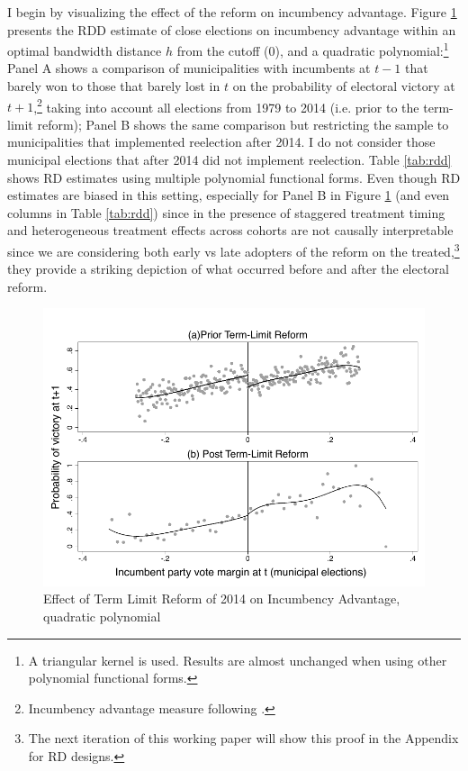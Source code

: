 \documentclass[12pt]{amsart}
\numberwithin{equation}{section}
\theoremstyle{definition}
\theoremstyle{definition}
\theoremstyle{definition}
\begin{document}
\begin{appendix}
I begin by visualizing the effect of the reform on incumbency advantage.  Figure \ref{fig:incumbency_advantage} presents the RDD estimate of close elections on incumbency advantage  within an optimal bandwidth distance $h$ from the cutoff (0), and a quadratic polynomial:\footnote{A triangular kernel is used. Results are almost unchanged when using other polynomial functional forms.} Panel A shows a comparison of municipalities with incumbents at $t-1$ that barely won to those that barely lost in $t$ on the probability of electoral victory at $t+1$,\footnote{Incumbency advantage measure following \citet{klasnja_titiunik_2017}.} taking into account all elections from 1979 to 2014 (i.e. prior to the term-limit reform); Panel B shows the same comparison but restricting the sample to municipalities that implemented reelection after 2014. I do not consider those municipal elections that after 2014 did not implement reelection. Table \ref{tab:rdd} shows RD estimates using multiple polynomial functional forms. Even though RD estimates are biased in this setting, especially for Panel B in Figure \ref{fig:incumbency_advantage} (and even columns in Table \ref{tab:rdd}) since in the presence of staggered treatment timing and heterogeneous treatment effects across cohorts are not causally interpretable since we are considering both early vs late adopters of the reform on the treated,\footnote{The next iteration of this working paper will show this proof in the Appendix for RD designs.} they provide a striking depiction of what occurred before and after the electoral reform. 


\begin{figure}[H]
\centering
\caption{Effect of Term Limit Reform of 2014 on Incumbency Advantage, quadratic polynomial}
  \label{fig:incumbency_advantage} 

 \includegraphics[width=1\textwidth]{Figures/RDD_incumbency_pol2.pdf}
     \captionsetup{justification=centering}  
       

\end{figure}
\end{appendix}
\end{document}
